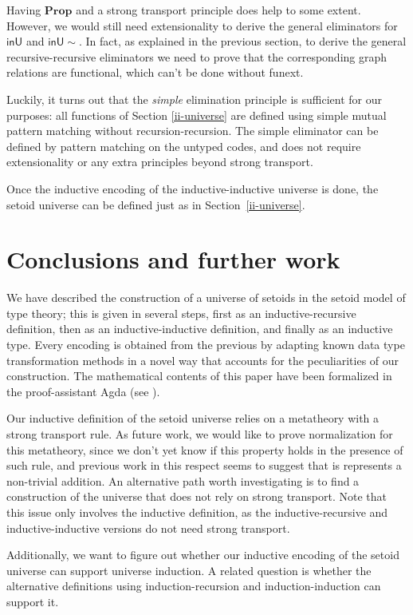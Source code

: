 \documentclass[a4paper,UKenglish,cleveref, autoref, thm-restate]{lipics-v2019}
\newcommand{\inU}{\mathsf{inU}}
\newcommand{\inUU}{\mathsf{inU{\sim}}}
\newcommand{\mProp}{\mathbf{Prop}}
\begin{document}
Having $\mProp$ and a strong transport principle does help to some extent.
%
However, we would still need extensionality to derive the general eliminators
for $\inU$ and $\inUU$. In fact, as explained in the previous section,
to derive the general recursive-recursive eliminators we need to prove that the
corresponding graph relations are functional, which can't be done without funext.

Luckily, it turns out that the \emph{simple} elimination principle is sufficient
for our purposes: all functions of Section \ref{ii-universe} are defined using simple mutual pattern matching without recursion-recursion.
The simple eliminator can be defined by pattern matching on
the untyped codes, and does not require extensionality or any extra principles
beyond strong transport.

Once the inductive encoding of the inductive-inductive universe is done, the
setoid universe can be defined just as in Section~\ref{ii-universe}.

\section{Conclusions and further work}\label{further-work}

We have described the construction of a universe of setoids in the setoid model
of type theory; this is given in several steps, first as an inductive-recursive
definition, then as an inductive-inductive definition, and finally as an
inductive type. Every encoding is obtained from the previous by adapting known
data type transformation methods in a novel way that accounts for the
peculiarities of our construction. The mathematical contents of this paper have
been formalized in the proof-assistant Agda (see \cite{agda-code}).

Our inductive definition of the setoid universe relies on a metatheory with a
strong transport rule. As future work, we would like to prove normalization for
this metatheory, since we don't yet know if this property holds in the presence
of such rule, and previous work in this respect \cite{abel2019failure} seems to
suggest that is represents a non-trivial addition.
%
An alternative path worth investigating is to find a construction of the
universe that does not rely on strong transport. Note that this issue only
involves the inductive definition, as the inductive-recursive and
inductive-inductive versions do not need strong transport.

Additionally, we want to figure out whether our inductive encoding of the setoid
universe can support universe induction. A related question is whether the
alternative definitions using induction-recursion and induction-induction can
support it.
\end{document}
